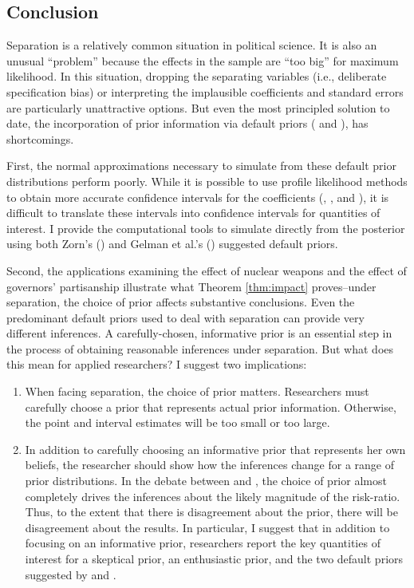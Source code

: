 \documentclass[12pt]{article}
\begin{document}
\subsection*{Conclusion}

Separation is a relatively common situation in political science. 
It is also an unusual ``problem'' because the effects in the sample are ``too big'' for maximum likelihood. 
In this situation, dropping the separating variables (i.e., deliberate specification bias) or interpreting the implausible coefficients and standard errors are particularly unattractive options. 
But even the most principled solution to date, the incorporation of prior information via default priors (\citealt{Zorn2005} and \citealt{Gelmanetal2008}), has shortcomings.

First, the normal approximations necessary to simulate from these default prior distributions perform poorly. 
While it is possible to use profile likelihood methods to obtain more accurate confidence intervals for the coefficients (\citealt{Zorn2005}, \citealt{HeinzeSchemper2002}, and \citealt{McCullaghNelder1989}), it is difficult to translate these intervals into confidence intervals for quantities of interest. 
I provide the computational tools to simulate directly from the posterior using both Zorn's (\citeyear{Zorn2005}) and Gelman et al.'s (\citeyear{Gelmanetal2008}) suggested default priors.

Second, the applications examining the effect of nuclear weapons and the effect of governors' partisanship illustrate what Theorem \ref{thm:impact} proves--under separation, the choice of prior affects substantive conclusions. 
Even the predominant default priors used to deal with separation can provide very different inferences. 
A carefully-chosen, informative prior is an essential step in the process of obtaining reasonable inferences under separation. 
But what does this mean for applied researchers? 
I suggest two implications:
\begin{enumerate}
\item When facing separation, the choice of prior matters. 
Researchers must carefully choose a prior that represents actual prior information. 
Otherwise, the point and interval estimates will be too small or too large.
\item In addition to carefully choosing an informative prior that represents her own beliefs, the researcher should show how the inferences change for a range of prior distributions. 
In the debate between \cite{BellMiller2015} and \cite{Rauchhaus2009}, the choice of prior almost completely drives the inferences about the likely magnitude of the risk-ratio. 
Thus, to the extent that there is disagreement about the prior, there will be disagreement about the results. 
In particular, I suggest that in addition to focusing on an informative prior, researchers report the key quantities of interest for a skeptical prior, an enthusiastic prior, and the two default priors suggested by \cite{Zorn2005} and \cite{Gelmanetal2008}.
\end{enumerate}
\end{document}
